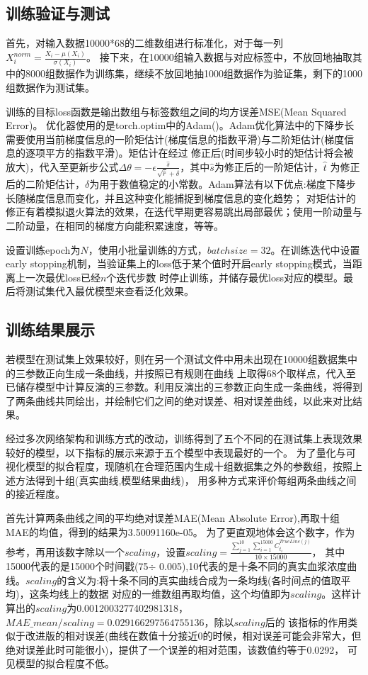 \documentclass{article}
\begin{document}
\subsection*{训练验证与测试}

首先，对输入数据10000*68的二维数组进行标准化，对于每一列$X^{norm}_i=\frac{X_i-\mu(X_i)}{\sigma(X_i) } $。
接下来，在10000组输入数据与对应标签中，不放回地抽取其中的8000组数据作为训练集，继续不放回地抽1000组数据作为验证集，剩下的1000组数据作为测试集。

训练的目标loss函数是输出数组与标签数组之间的均方误差MSE(Mean Squared Error)。
优化器使用的是torch.optim中的Adam()。Adam优化算法中的下降步长需要使用当前梯度信息的一阶矩估计(梯度信息的指数平滑)与二阶矩估计(梯度信息的逐项平方的指数平滑)。矩估计在经过
修正后(时间步较小时的矩估计将会被放大)，代入至更新步公式$\Delta \theta   = -\epsilon \frac{\hat{s}}{\sqrt{\hat{r}} +\delta } $，其中$\hat{s}$为修正后的一阶矩估计，$\hat{t}$
为修正后的二阶矩估计，$\delta$为用于数值稳定的小常数。Adam算法有以下优点:梯度下降步长随梯度信息而变化，并且这种变化能捕捉到梯度信息的变化趋势；
对矩估计的修正有着模拟退火算法的效果，在迭代早期更容易跳出局部最优；使用一阶动量与二阶动量，在相同的梯度方向能积累速度，等等。

设置训练epoch为$N$，使用小批量训练的方式，$batchsize = 32$。在训练迭代中设置early stopping机制，当验证集上的loss低于某个值时开启early stopping模式，当距离上一次最优loss已经$n$个迭代步数
时停止训练，并储存最优loss对应的模型。最后将测试集代入最优模型来查看泛化效果。



\subsection*{训练结果展示}

若模型在测试集上效果较好，则在另一个测试文件中用未出现在10000组数据集中的三参数正向生成一条曲线，并按照已有规则在曲线
上取得68个取样点，代入至已储存模型中计算反演的三参数。利用反演出的三参数正向生成一条曲线，将得到了两条曲线共同绘出，并绘制它们之间的绝对误差、相对误差曲线，以此来对比结果。

经过多次网络架构和训练方式的改动，训练得到了五个不同的在测试集上表现效果较好的模型，以下指标的展示来源于五个模型中表现最好的一个。
为了量化与可视化模型的拟合程度，现随机在合理范围内生成十组数据集之外的参数组，按照上述方法得到十组(真实曲线,模型结果曲线)，
用多种方式来评价每组两条曲线之间的接近程度。

首先计算两条曲线之间的平均绝对误差MAE(Mean Absolute Error),再取十组MAE的均值，得到的结果为3.50091160e-05。
为了更直观地体会这个数字，作为参考，再用该数字除以一个$scaling$，设置$scaling=\frac{\sum_{j = 1}^{10} \sum_{i = 1}^{15000} C^{TrueLine(j)}_{t_{i}}}{10\times15000}  $，
其中15000代表的是15000个时间戳(75$\div$ 0.005),10代表的是十条不同的真实血浆浓度曲线。$scaling$的含义为:将十条不同的真实曲线合成为一条均线(各时间点的值取平均)，这条均线上的数据
对应的一维数组再取均值，这个均值即为$scaling$。这样计算出的$scaling$为0.0012003277402981318，$MAE\_mean/scaling = 0.029166297564755136$，除以$scaling$后的
该指标的作用类似于改进版的相对误差(曲线在数值十分接近0的时候，相对误差可能会非常大，但绝对误差此时可能很小)，提供了一个误差的相对范围，该数值约等于0.0292，
可见模型的拟合程度不低。
\end{document}
